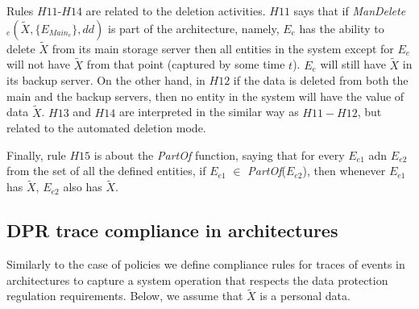 \documentclass[a4paper]{article}
\begin{document}
Rules $H11$-$H14$ are related to the deletion activities. $H11$ says that if \textit{ManDelete}$_{e}(\tilde{X}, \{E_{\textit{Main}_{e}}\}, dd)$ is part of the architecture, namely, $E_e$ has the ability to delete $\tilde{X}$ from its main storage server then all entities in the system except for $E_e$ will not have $\tilde{X}$ from that point (captured by some time $t$). $E_e$ will still have $\tilde{X}$ in its backup server. On the other hand, in $H12$ if the data is deleted from both the main and the backup servers, then no entity in the system will have the value of data $\tilde{X}$. $H13$ and $H14$ are interpreted in the similar way as  $H11-H12$, but related to the automated deletion mode.    

Finally, rule $H15$ is about the \textit{PartOf} function, saying that for every $E_{e1}$ adn $E_{e2}$ from the set of all the defined entities, if $E_{e1}$ $\in$ \textit{PartOf}($E_{e2}$), then whenever $E_{e1}$ has $\tilde{X}$, $E_{e2}$ also has $\tilde{X}$.


\subsection{DPR trace compliance in architectures}
\label{tracesarch}
Similarly to the case of policies we define compliance rules for traces of events in architectures to capture a system operation that respects the data protection regulation requirements. Below, we assume that $\tilde{X}$ is a personal data.  
\end{document}
